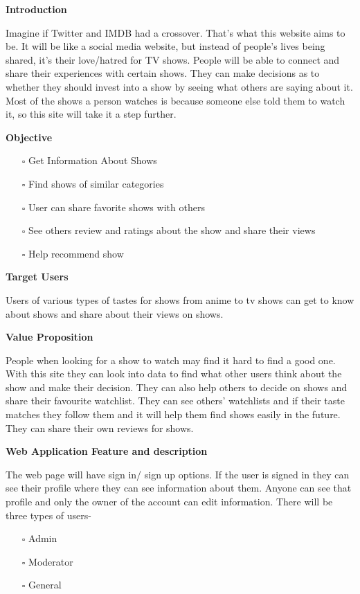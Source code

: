 \documentclass[]{article}
\begin{document}
\textbf{Introduction }

Imagine if Twitter and IMDB had a crossover. That's what this website
aims to be. It will be like a social media website, but instead of
people's lives being shared, it's their love/hatred for TV shows. People
will be able to connect and share their experiences with certain shows.
They can make decisions as to whether they should invest into a show by
seeing what others are saying about it. Most of the shows a person
watches is because someone else told them to watch it, so this site will
take it a step further.

\textbf{Objective}

\begin{itemize}
\item[$\square$]
  Get Information About Shows
\item[$\square$]
  Find shows of similar categories
\item[$\square$]
  User can share favorite shows with others
\item[$\square$]
  See others review and ratings about the show and share their views
\item[$\square$]
  Help recommend show
\end{itemize}

\textbf{Target Users}

Users of various types of tastes for shows from anime to tv shows can
get to know about shows and share about their views on shows.

\textbf{Value Proposition }

People when looking for a show to watch may find it hard to find a good
one. With this site they can look into data to find what other users
think about the show and make their decision. They can also help others
to decide on shows and share their favourite watchlist. They can see
others' watchlists and if their taste matches they follow them and it
will help them find shows easily in the future. They can share their own
reviews for shows.

\textbf{Web Application Feature and description}

The web page will have sign in/ sign up options. If the user is signed
in they can see their profile where they can see information about them.
Anyone can see that profile and only the owner of the account can edit
information. There will be three types of users-

\begin{itemize}
\item[$\square$]
  Admin
\item[$\square$]
  Moderator
\item[$\square$]
  General
\end{itemize}
\end{document}
